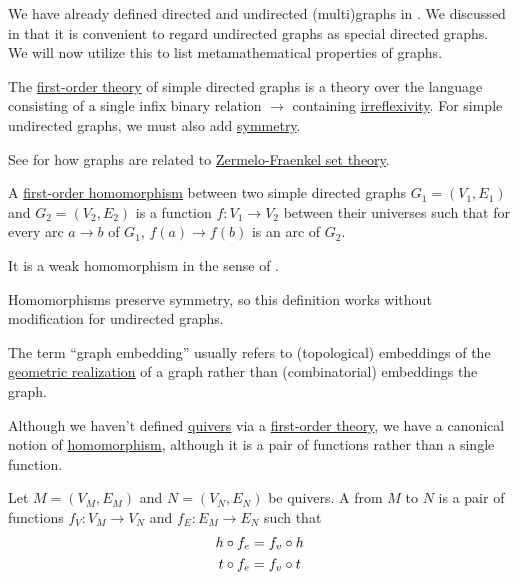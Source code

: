 \begin{definition}\label{def:theory_of_graphs}
  We have already defined directed and undirected (multi)graphs in . We discussed in  that it is convenient to regard undirected graphs as special directed graphs. We will now utilize this to list metamathematical properties of graphs.

  \begin{thmenum}
     The \hyperref[def:first_order_theory]{first-order theory} of simple directed graphs is a theory over the language consisting of a single infix binary relation \( \to \) containing \hyperref[def:binary_relation/irreflexive]{irreflexivity}. For simple undirected graphs, we must also add \hyperref[def:binary_relation/symmetric]{symmetry}.

    See  for how graphs are related to \hyperref[def:zfc]{Zermelo-Fraenkel set theory}.

     A \hyperref[def:first_order_homomorphism]{first-order homomorphism} between two simple directed graphs \( G_1 = (V_1, E_1) \) and \( G_2 = (V_2, E_2) \) is a function \( f: V_1 \to V_2 \) between their universes such that for every arc \( a \to b \) of \( G_1 \), \( f(a) \to f(b) \) is an arc of \( G_2 \).

    It is a weak homomorphism in the sense of .

    Homomorphisms preserve symmetry, so this definition works without modification for undirected graphs.

    The term \enquote{graph embedding} usually refers to (topological) embeddings of the \hyperref[def:quiver_geometric_realization]{geometric realization} of a graph rather than (combinatorial) embeddings the graph.

     Although we haven't defined \hyperref[def:graph/quiver]{quivers} via a \hyperref[def:first_order_theory]{first-order theory}, we have a canonical notion of \hyperref[def:first_order_homomorphism]{homomorphism}, although it is a pair of functions rather than a single function.

    Let \( M = (V_M, E_M) \) and \( N = (V_N, E_N) \) be quivers. A  from \( M \) to \( N \) is a pair of functions \( f_V: V_M \to V_N \) and \( f_E: E_M \to E_N \) such that
    \begin{align}
      h \mathbin \circ f_e &= f_v \mathbin \circ h \label{eq:def:theory_of_graphs/quiver_homomorphism/head} \\
      t \mathbin \circ f_e &= f_v \mathbin \circ t \label{eq:def:theory_of_graphs/quiver_homomorphism/tail}
    \end{align}


\end{thmenum}
\end{definition}
